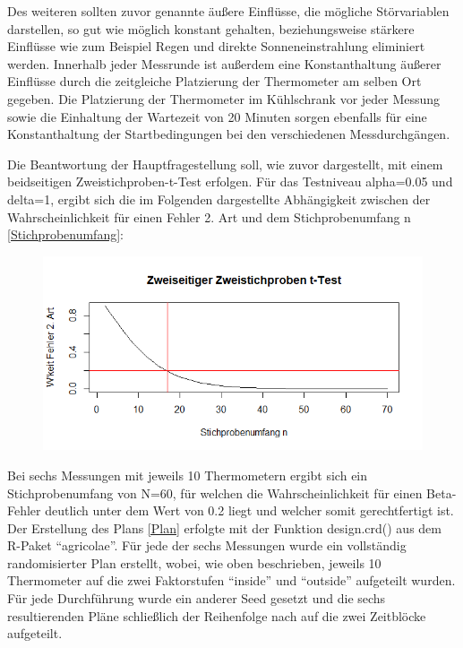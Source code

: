 \documentclass[ ngerman, fontsize= 12pt, paper=a4, headings=big, titlepage=true]{article}
\begin{document}
\noindent Des weiteren sollten zuvor genannte äußere Einflüsse, die mögliche Störvariablen darstellen, so gut wie möglich konstant gehalten, beziehungsweise stärkere Einflüsse wie zum Beispiel Regen und direkte Sonneneinstrahlung eliminiert werden. Innerhalb jeder Messrunde ist außerdem eine Konstanthaltung äußerer Einflüsse durch die zeitgleiche Platzierung der Thermometer am selben Ort gegeben. Die Platzierung der Thermometer im Kühlschrank vor jeder Messung sowie die Einhaltung der Wartezeit von 20 Minuten sorgen ebenfalls für eine Konstanthaltung der Startbedingungen bei den verschiedenen Messdurchgängen.


\noindent Die Beantwortung der Hauptfragestellung soll, wie zuvor dargestellt, mit einem beidseitigen Zweistichproben-t-Test erfolgen. Für das Testniveau alpha=0.05 und delta=1, ergibt sich die im Folgenden dargestellte Abhängigkeit zwischen der Wahrscheinlichkeit für einen Fehler 2. Art und dem Stichprobenumfang n \ref{Stichprobenumfang}: \\

\begin{figure}[h]
\centering
\includegraphics[scale=0.7]{Stichprobenumfang.png}

\end{figure} 

\noindent Bei sechs Messungen mit jeweils 10 Thermometern ergibt sich ein Stichprobenumfang von N=60, für welchen die Wahrscheinlichkeit für einen Beta-Fehler deutlich unter dem Wert von 0.2 liegt und welcher somit gerechtfertigt ist. \\

\noindent Der Erstellung des Plans \ref{Plan} erfolgte mit der Funktion design.crd() aus dem R-Paket \enquote{agricolae}. Für jede der sechs Messungen wurde ein vollständig randomisierter Plan erstellt, wobei, wie oben beschrieben, jeweils 10 Thermometer auf die zwei Faktorstufen \enquote{inside} und \enquote{outside} aufgeteilt wurden. Für jede Durchführung wurde ein anderer Seed gesetzt und die sechs resultierenden Pläne schließlich der Reihenfolge nach auf die zwei Zeitblöcke aufgeteilt. 
\end{document}
